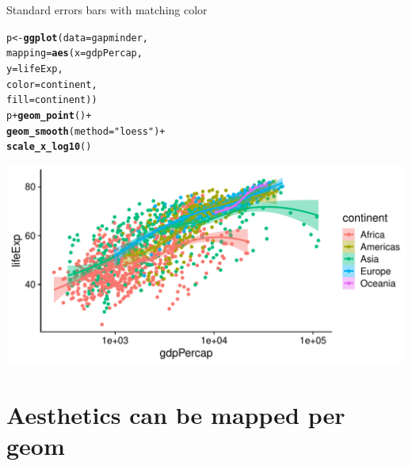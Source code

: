 \documentclass[10pt,handout]{beamer}\usepackage[]{graphicx}\usepackage[]{color}
\makeatletter
\def\maxwidth{ %
  \ifdim\Gin@nat@width>\linewidth
    \linewidth
  \else
    \Gin@nat@width
  \fi
}
\newcommand{\hlstr}[1]{\textcolor[rgb]{0.192,0.494,0.8}{#1}}%
\newcommand{\hlopt}[1]{\textcolor[rgb]{0,0,0}{#1}}%
\newcommand{\hlstd}[1]{\textcolor[rgb]{0.345,0.345,0.345}{#1}}%
\newcommand{\hlkwb}[1]{\textcolor[rgb]{0.69,0.353,0.396}{#1}}%
\newcommand{\hlkwc}[1]{\textcolor[rgb]{0.333,0.667,0.333}{#1}}%
\newcommand{\hlkwd}[1]{\textcolor[rgb]{0.737,0.353,0.396}{\textbf{#1}}}%
\newenvironment{kframe}{%
 \def\at@end@of@kframe{}%
 \ifinner\ifhmode%
  \def\at@end@of@kframe{\end{minipage}}%
  \begin{minipage}{\columnwidth}%
 \fi\fi%
 \def\FrameCommand##1{\hskip\@totalleftmargin \hskip-\fboxsep
 \colorbox{shadecolor}{##1}\hskip-\fboxsep
     \hskip-\linewidth \hskip-\@totalleftmargin \hskip\columnwidth}%
 \MakeFramed {\advance\hsize-\width
   \@totalleftmargin\z@ \linewidth\hsize
   \@setminipage}}%
 {\par\unskip\endMakeFramed%
 \at@end@of@kframe}
\newenvironment{knitrout}{}{} %
\makeatother
\begin{document}
\begin{frame}[fragile]{Standard errors bars with matching color}
\begin{knitrout}\tiny
{}\color{fgcolor}\begin{kframe}
\begin{alltt}
\hlstd{p} \hlkwb{<-} \hlkwd{ggplot}\hlstd{(}\hlkwc{data} \hlstd{= gapminder,}
                \hlkwc{mapping} \hlstd{=} \hlkwd{aes}\hlstd{(}\hlkwc{x} \hlstd{= gdpPercap,}
                \hlkwc{y} \hlstd{= lifeExp,}
                \hlkwc{color} \hlstd{= continent,}
                \hlkwc{fill} \hlstd{= continent))}
\hlstd{p} \hlopt{+} \hlkwd{geom_point}\hlstd{()} \hlopt{+}
\hlkwd{geom_smooth}\hlstd{(}\hlkwc{method} \hlstd{=} \hlstr{"loess"}\hlstd{)} \hlopt{+}
\hlkwd{scale_x_log10}\hlstd{()}
\end{alltt}
\end{kframe}

{\centering \includegraphics[width=\maxwidth]{figure/unnamed-chunk-17-1} 

}


\end{knitrout}
\end{frame}






\section{Aesthetics can be mapped per geom}
\end{document}
